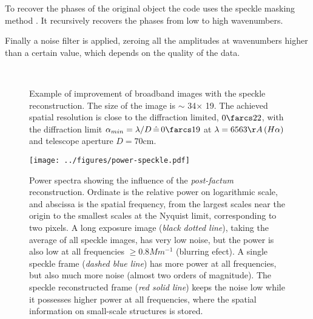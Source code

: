 To recover the phases of the original object the code uses the speckle masking method \citep{1977OptCo..21...55W,1983OptL....8..389W}. It recursively recovers the phases from low to high wavenumbers.

Finally a noise filter is applied, zeroing all the amplitudes at wavenumbers higher than a certain value, which depends on the quality of the data.
\begin{figure}[t]
  \centering
  \quad%
    \\
  \quad%
    \caption{Example of improvement of broadband images with the speckle reconstruction. The size of the image is $\sim$ 34\arcsec $\times$ 19\arcsec. The achieved spatial resolution is close to the diffraction limited, $ 0\farcs22$, with the diffraction limit $\alpha_{min}=\lambda/D  \, \hat{=}\, 0\farcs19$ at $\lambda=6563 \AA\,(H\alpha)$ and telescope aperture $D=70$cm. }
\label{fig:obs:red}

\end{figure}

\begin{figure}[t]
\begin{center}
\texttt{[image: ../figures/power-speckle.pdf]}
\caption{Power spectra showing the influence of the \emph{post-factum} reconstruction. Ordinate is the relative power on logarithmic scale, and abscissa is the spatial frequency, from the largest scales near the origin to the smallest scales at the Nyquist limit, corresponding to two pixels. A long exposure image (\emph{black dotted line}), taking the average of all speckle images, has very low noise, but the power is also low at all frequencies $\geqslant 0.8 Mm^{-1}$ (blurring efect). A single speckle frame (\emph{dashed blue line}) has more power at all frequencies, but also much more noise (almost two orders of magnitude). The speckle reconstructed frame (\emph{red solid line}) keeps the noise low while it possesses higher power at all frequencies, where the spatial information on small-scale structures is stored.}
\label{fig:obs:speckle:power}
\end{center}
\end{figure}
